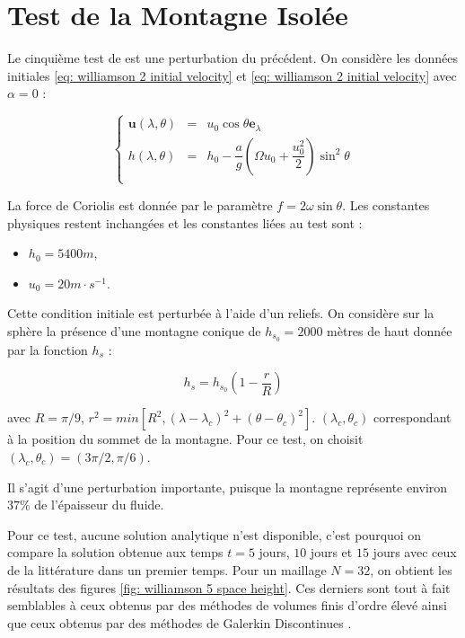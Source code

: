 \newpage
\section{Test de la Montagne Isolée}

Le cinquième test de \cite{Williamson1992} est une perturbation du précédent.
On considère les données initiales \eqref{eq: williamson 2 initial velocity} et \eqref{eq: williamson 2 initial velocity} avec $\alpha = 0$ :

\begin{equation}
\left\lbrace
\begin{array}{rcl}
\mathbf{u}(\lambda, \theta) & = & u_0 \cos \theta \mathbf{e}_{\lambda} \\
h(\lambda, \theta) & = & h_0 - \dfrac{a}{g} \left( \Omega u_0 + \dfrac{u_0^2}{2} \right) \sin^2 \theta \\
\end{array}
\right.
\end{equation}

La force de Coriolis est donnée par le paramètre $f = 2 \omega \sin \theta$. Les constantes physiques restent inchangées et les constantes liées au test sont :

\begin{itemize}
\item $h_0 = 5400 \si{m}$,
\item $u_0 = 20 m \cdot \si{s^{-1}}$.
\end{itemize}

Cette condition initiale est perturbée à l'aide d'un reliefs.
On considère sur la sphère la présence d'une montagne conique de $h_{s_0} = 2000$ mètres de haut donnée par la fonction $h_s$ :

\begin{equation}
h_s = h_{s_0} \left( 1 - \dfrac{r}{R} \right)
\end{equation}

avec $R= \pi / 9$, $r^2 = min \left[ R^2, \left( \lambda - \lambda_c \right)^2 + \left( \theta - \theta_c \right)^2 \right]$. $(\lambda_c, \theta_c)$ correspondant à la position du sommet de la montagne. Pour ce test, on choisit $(\lambda_c, \theta_c) = (3 \pi / 2, \pi / 6)$.

Il s'agit d'une perturbation importante, puisque la montagne représente environ $37 \%$ de l'épaisseur du fluide.

Pour ce test, aucune solution analytique n'est disponible, c'est pourquoi on compare la solution obtenue aux temps $t=5$ jours, $10$ jours et $15$ jours avec ceux de la littérature dans un premier temps. Pour un maillage $N=32$, on obtient les résultats des figures \ref{fig: williamson 5 space height}. Ces derniers sont tout à fait semblables à ceux obtenus par des méthodes de volumes finis \cite{Katta2015, Chen2008} d'ordre élevé ainsi que ceux obtenus par des méthodes de Galerkin Discontinues \cite{Nair2005}. 

